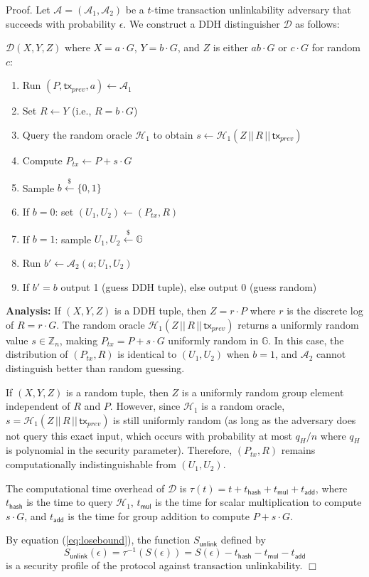 \documentclass{article}
\newenvironment{proof}{\textsf{Proof}.}{\hfill$\Box$}
\begin{document}
\begin{proof}
Let $\mathcal{A} = (\mathcal{A}_1, \mathcal{A}_2)$ be a $t$-time transaction unlinkability adversary that succeeds with probability $\epsilon$. We construct a DDH distinguisher $\mathcal{D}$ as follows:

$\mathcal{D}(X, Y, Z)$ where $X = a \cdot G$, $Y = b \cdot G$, and $Z$ is either $ab \cdot G$ or $c \cdot G$ for random $c$:
\begin{enumerate}
\item Run $(P, \mathsf{tx}_{prev}, a) \gets \mathcal{A}_1$
\item Set $R \leftarrow Y$ (i.e., $R = b \cdot G$)
\item Query the random oracle $\mathcal{H}_1$ to obtain $s \leftarrow \mathcal{H}_1(Z \,||\, R \,||\, \mathsf{tx}_{prev})$
\item Compute $P_{tx} \leftarrow P + s \cdot G$
\item Sample $b \stackrel{\$}{\leftarrow} \{0,1\}$
\item If $b = 0$: set $(U_1, U_2) \leftarrow (P_{tx}, R)$
\item If $b = 1$: sample $U_1, U_2 \stackrel{\$}{\leftarrow} \mathbb{G}$
\item Run $b' \gets \mathcal{A}_2(a; U_1, U_2)$
\item If $b' = b$ output 1 (guess DDH tuple), else output 0 (guess random)
\end{enumerate}

\textbf{Analysis:} If $(X, Y, Z)$ is a DDH tuple, then $Z = r \cdot P$ where $r$ is the discrete log of $R = r \cdot G$. The random oracle $\mathcal{H}_1(Z \,||\, R \,||\, \mathsf{tx}_{prev})$ returns a uniformly random value $s \in \mathbb{Z}_n$, making $P_{tx} = P + s \cdot G$ uniformly random in $\mathbb{G}$. In this case, the distribution of $(P_{tx}, R)$ is identical to $(U_1, U_2)$ when $b = 1$, and $\mathcal{A}_2$ cannot distinguish better than random guessing.

If $(X, Y, Z)$ is a random tuple, then $Z$ is a uniformly random group element independent of $R$ and $P$. However, since $\mathcal{H}_1$ is a random oracle, $s = \mathcal{H}_1(Z \,||\, R \,||\, \mathsf{tx}_{prev})$ is still uniformly random (as long as the adversary does not query this exact input, which occurs with probability at most $q_H/n$ where $q_H$ is polynomial in the security parameter). Therefore, $(P_{tx}, R)$ remains computationally indistinguishable from $(U_1, U_2)$.

The computational time overhead of $\mathcal{D}$ is $\tau(t) = t + t_\mathsf{hash} + t_\mathsf{mul} + t_\mathsf{add}$, where $t_\mathsf{hash}$ is the time to query $\mathcal{H}_1$, $t_\mathsf{mul}$ is the time for scalar multiplication to compute $s \cdot G$, and $t_\mathsf{add}$ is the time for group addition to compute $P + s \cdot G$.

By equation (\ref{eq:losebound}), the function $S_\mathsf{unlink}$ defined by
\[
S_\mathsf{unlink}(\epsilon) = \tau^{-1}(S(\epsilon)) = S(\epsilon) - t_\mathsf{hash} - t_\mathsf{mul} - t_\mathsf{add}
\]
is a security profile of the protocol against transaction unlinkability.
\end{proof}
\end{document}
